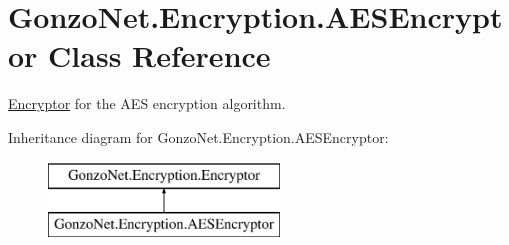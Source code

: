 \hypertarget{class_gonzo_net_1_1_encryption_1_1_a_e_s_encryptor}{\section{Gonzo\+Net.\+Encryption.\+A\+E\+S\+Encryptor Class Reference}
\label{class_gonzo_net_1_1_encryption_1_1_a_e_s_encryptor}
}


\hyperlink{class_gonzo_net_1_1_encryption_1_1_encryptor}{Encryptor} for the A\+E\+S encryption algorithm.  


Inheritance diagram for Gonzo\+Net.\+Encryption.\+A\+E\+S\+Encryptor\+:\begin{figure}[H]
\begin{center}
\leavevmode
\includegraphics[height=2.000000cm]{class_gonzo_net_1_1_encryption_1_1_a_e_s_encryptor}
\end{center}
\end{figure}
